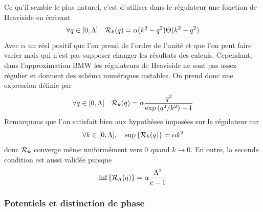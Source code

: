 \documentclass[10pt]{article}
\begin{document}
\begin{multicols}{2}
Ce qu'il semble le plus naturel, c'est d'utiliser dans le régulateur une fonction de Heaviside en écrivant 
\begin{equation}
	\forall q \in [0, \Lambda] \quad \mathcal{R}_k(q) = \alpha (k^2 - q^2) \Theta(k^2 - q^2)
\end{equation}
Avec $\alpha$ un réel positif que l'on prend de l'ordre de l'unité et que l'on peut faire varier mais qui n'est pas supposer changer les résultats des calculs. Cependant, dans l'approximation BMW les régulateurs de Heaviside ne sont pas assez régulier et donnent des schéma numériques instables. On prend donc une expression définie par
\begin{equation}
	\forall q \in [0, \Lambda] \quad \mathcal{R}_k(q) = \alpha \frac{q^2}{\exp{(q^2/k^2)}-1}
\end{equation}
Remarquons que l'on satisfait bien aux hypothèses imposées sur le régulateur car 
\begin{equation}
	\forall k \in [0,\Lambda],  \quad \text{sup} \left\{ \mathcal{R}_k(q) \right\} = \alpha k^2
\end{equation}
donc $\mathcal{R}_k$ converge même uniformément vers 0 quand $k \to 0$. En outre, la seconde condition est aussi validée puisque
\begin{equation}
	 \text{inf}\left\{ \mathcal{R}_\Lambda(q) \right\} = \alpha \frac{\Lambda^2}{e-1}
\end{equation}



\vspace*{11pt}
\subsubsection{Potentiels et distinction de phase}


\end{multicols}
\end{document}
